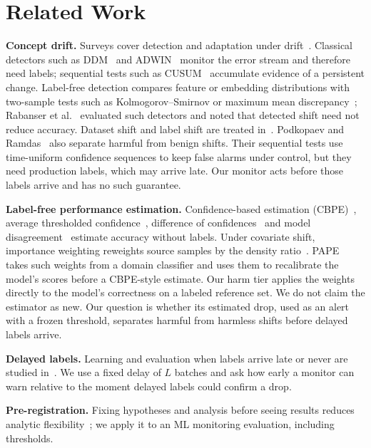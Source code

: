 \documentclass[conference]{IEEEtran}
\begin{document}
\section{Related Work}
\textbf{Concept drift.} Surveys cover detection and adaptation under drift~\cite{gama2014survey,lu2019review}. Classical detectors such as DDM~\cite{gama2004ddm} and ADWIN~\cite{bifet2007adwin} monitor the error stream and therefore need labels; sequential tests such as CUSUM~\cite{page1954cusum} accumulate evidence of a persistent change. Label-free detection compares feature or embedding distributions with two-sample tests such as Kolmogorov--Smirnov or maximum mean discrepancy~\cite{gretton2012mmd}; Rabanser et al.~\cite{rabanser2019failing} evaluated such detectors and noted that detected shift need not reduce accuracy. Dataset shift and label shift are treated in~\cite{quinonero2009shift,lipton2018labelshift}. Podkopaev and Ramdas~\cite{podkopaev2022tracking} also separate harmful from benign shifts. Their sequential tests use time-uniform confidence sequences to keep false alarms under control, but they need production labels, which may arrive late. Our monitor acts before those labels arrive and has no such guarantee.

\textbf{Label-free performance estimation.} Confidence-based estimation (CBPE)~\cite{nannyml_cbpe}, average thresholded confidence~\cite{garg2022atc}, difference of confidences~\cite{guillory2021doc} and model disagreement~\cite{jiang2022disagreement} estimate accuracy without labels. Under covariate shift, importance weighting reweights source samples by the density ratio~\cite{shimodaira2000,sugiyama2007iwcv}. PAPE~\cite{bialek2025pape} takes such weights from a domain classifier and uses them to recalibrate the model's scores before a CBPE-style estimate. Our harm tier applies the weights directly to the model's correctness on a labeled reference set. We do not claim the estimator as new. Our question is whether its estimated drop, used as an alert with a frozen threshold, separates harmful from harmless shifts before delayed labels arrive.

\textbf{Delayed labels.} Learning and evaluation when labels arrive late or never are studied in~\cite{grzenda2020delayed,umer2020evl}. We use a fixed delay of $L$ batches and ask how early a monitor can warn relative to the moment delayed labels could confirm a drop.

\textbf{Pre-registration.} Fixing hypotheses and analysis before seeing results reduces analytic flexibility~\cite{vanmiltenburg2021prereg}; we apply it to an ML monitoring evaluation, including thresholds.
\end{document}
